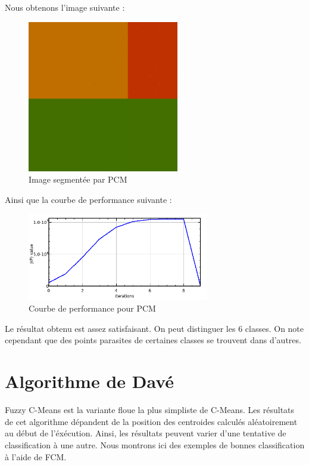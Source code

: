 \documentclass[a4paper,11pt]{article}
\begin{document}
Nous obtenons l'image suivante :

\begin{figure}[H]
\begin{center}
\includegraphics[width=250px]{../img/PCM.png}
\end{center}
\caption{Image segmentée par PCM}
\end{figure}

Ainsi que la courbe de performance suivante :

\begin{figure}[H]
\begin{center}
\includegraphics[width=300px]{../img/Perf_PCM.png}
\end{center}
\caption{Courbe de performance pour PCM}
\end{figure}

Le résultat obtenu est assez satisfaisant. On peut distinguer les 6 classes. On note cependant que des points parasites de certaines classes se trouvent dans d'autres.

\section{Algorithme de Davé}
Fuzzy C-Means est la variante floue la plus simpliste de C-Means. Les résultats de cet algorithme dépandent de la position des centroides calculés aléatoirement au début de l'éxécution. Ainsi, les résultats peuvent varier d'une tentative de classification à une autre. Nous montrons ici des exemples de bonnes classification à l'aide de FCM.
\end{document}

